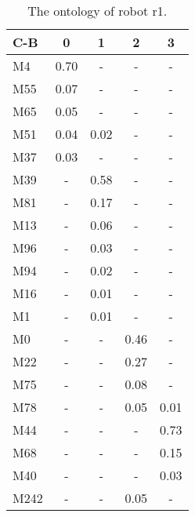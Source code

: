 \begin{table}[h]
\centering
{\footnotesize\begin{tabular}{||l|c|c|c|c||}
\hline\hline
C-B & 0 & 1 & 2 & 3\\\hline
M4 & 0.70 & - & - & -\\\hline
M55 & 0.07 & - & - & -\\\hline
M65 & 0.05 & - & - & -\\\hline
M51 & 0.04 & 0.02 & - & -\\\hline
M37 & 0.03 & - & - & -\\\hline
M39 & - & 0.58 & - & -\\\hline
M81 & - & 0.17 & - & -\\\hline
M13 & - & 0.06 & - & -\\\hline
M96 & - & 0.03 & - & -\\\hline
M94 & - & 0.02 & - & -\\\hline
M16 & - & 0.01 & - & -\\\hline
M1 & - & 0.01 & - & -\\\hline
M0 & - & - & 0.46 & -\\\hline
M22 & - & - & 0.27 & -\\\hline
M75 & - & - & 0.08 & -\\\hline
M78 & - & - & 0.05 & 0.01\\\hline
M44 & - & - & - & 0.73\\\hline
M68 & - & - & - & 0.15\\\hline
M40 & - & - & - & 0.03\\\hline
M242 & - & - & 0.05 & -\\\hline
\hline
\end{tabular}}
\caption{The ontology of robot r1.}
\label{t:st:ontology1}
\end{table}

